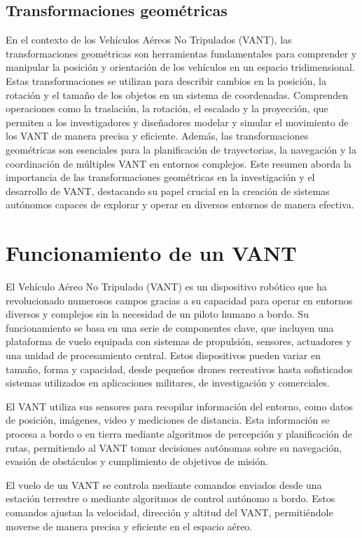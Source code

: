 \subsection*{Transformaciones geométricas}

En el contexto de los Vehículos Aéreos No Tripulados (VANT), las transformaciones geométricas son herramientas fundamentales para comprender y manipular la posición y orientación de los vehículos en un espacio tridimensional. Estas transformaciones se utilizan para describir cambios en la posición, la rotación y el tamaño de los objetos en un sistema de coordenadas. Comprenden operaciones como la traslación, la rotación, el escalado y la proyección, que permiten a los investigadores y diseñadores modelar y simular el movimiento de los VANT de manera precisa y eficiente. Además, las transformaciones geométricas son esenciales para la planificación de trayectorias, la navegación y la coordinación de múltiples VANT en entornos complejos. Este resumen aborda la importancia de las transformaciones geométricas en la investigación y el desarrollo de VANT, destacando su papel crucial en la creación de sistemas autónomos capaces de explorar y operar en diversos entornos de manera efectiva.

\section{Funcionamiento de un VANT}

El Vehículo Aéreo No Tripulado (VANT) es un dispositivo robótico que ha revolucionado numerosos campos gracias a su capacidad para operar en entornos diversos y complejos sin la necesidad de un piloto humano a bordo. Su funcionamiento se basa en una serie de componentes clave, que incluyen una plataforma de vuelo equipada con sistemas de propulsión, sensores, actuadores y una unidad de procesamiento central. Estos dispositivos pueden variar en tamaño, forma y capacidad, desde pequeños drones recreativos hasta sofisticados sistemas utilizados en aplicaciones militares, de investigación y comerciales.

El VANT utiliza sus sensores para recopilar información del entorno, como datos de posición, imágenes, video y mediciones de distancia. Esta información se procesa a bordo o en tierra mediante algoritmos de percepción y planificación de rutas, permitiendo al VANT tomar decisiones autónomas sobre su navegación, evasión de obstáculos y cumplimiento de objetivos de misión.

El vuelo de un VANT se controla mediante comandos enviados desde una estación terrestre o mediante algoritmos de control autónomo a bordo. Estos comandos ajustan la velocidad, dirección y altitud del VANT, permitiéndole moverse de manera precisa y eficiente en el espacio aéreo.

